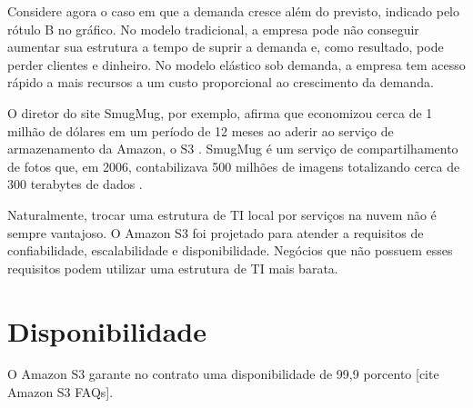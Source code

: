 Considere agora o caso em que a demanda cresce além do previsto, indicado pelo rótulo B no gráfico. No modelo tradicional, a empresa pode não conseguir aumentar sua estrutura a tempo de suprir a demanda e, como resultado, pode perder clientes e dinheiro. No modelo elástico sob demanda, a empresa tem acesso rápido a mais recursos a um custo proporcional ao crescimento da demanda.

O diretor do site SmugMug, por exemplo, afirma que economizou cerca de 1 milhão de dólares em um período de 12 meses ao aderir ao serviço de armazenamento da Amazon, o S3 \cite{http://blogs.smugmug.com/don/2006/11/10/amazon-s3-show-me-the-money/}. SmugMug é um serviço de compartilhamento de fotos que, em 2006, contabilizava 500 milhões de imagens totalizando cerca de 300 terabytes de dados \cite{http://blogs.smugmug.com/don/2006/08/12/amazon-s3-the-holy-grail/}.

Naturalmente, trocar uma estrutura de TI local por serviços na nuvem não é sempre vantajoso. O Amazon S3 foi projetado para atender a requisitos de confiabilidade, escalabilidade e disponibilidade. Negócios que não possuem esses requisitos podem utilizar uma estrutura de TI mais barata.

\section{Disponibilidade}
O Amazon S3 garante no contrato uma disponibilidade de 99,9 porcento [cite Amazon S3 FAQs].





